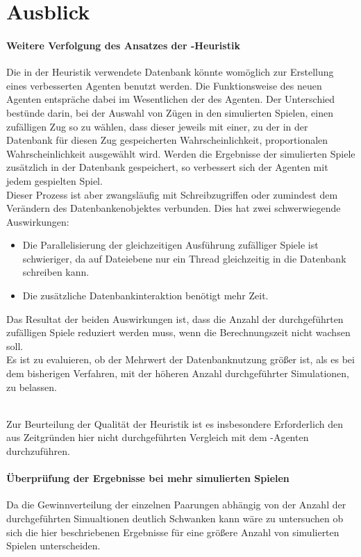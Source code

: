 
\section{Ausblick}
\paragraph{Weitere Verfolgung des Ansatzes der -Heuristik}
{\color{red}
Die in der  Heuristik verwendete Datenbank könnte womöglich zur Erstellung eines verbesserten Agenten benutzt werden. Die Funktionsweise des neuen Agenten entspräche dabei im Wesentlichen der des \mxZitat{\mc} Agenten. Der Unterschied bestünde darin, bei der Auswahl von Zügen in den simulierten Spielen, einen zufälligen Zug so zu wählen, dass dieser jeweils mit einer, zu der in der Datenbank für diesen Zug gespeicherten Wahrscheinlichkeit, proportionalen Wahrscheinlichkeit ausgewählt wird. Werden die Ergebnisse der simulierten Spiele zusätzlich in der Datenbank gespeichert, so verbessert sich der Agenten mit jedem gespielten Spiel.
\\Dieser Prozess ist aber zwangsläufig mit Schreibzugriffen oder zumindest dem Verändern des Datenbankenobjektes verbunden. Dies hat zwei schwerwiegende Auswirkungen:
\begin{itemize}
\item Die Parallelisierung der gleichzeitigen Ausführung zufälliger Spiele ist schwieriger, da auf Dateiebene nur ein Thread gleichzeitig in die Datenbank schreiben kann.
\item Die zusätzliche Datenbankinteraktion benötigt mehr Zeit.
\end{itemize}
Das Resultat der beiden Auswirkungen ist, dass die Anzahl der durchgeführten zufälligen Spiele reduziert werden muss, wenn die Berechnungszeit nicht wachsen soll.
\\Es ist zu evaluieren, ob der Mehrwert der Datenbanknutzung größer ist, als es bei dem bisherigen Verfahren, mit der höheren Anzahl durchgeführter Simulationen, zu belassen. }
\\Zur Beurteilung der Qualität der  Heuristik ist es insbesondere Erforderlich den aus Zeitgründen hier nicht durchgeführten Vergleich mit dem \mc -Agenten durchzuführen.
\paragraph{Überprüfung der Ergebnisse bei mehr simulierten Spielen}
Da die Gewinnverteilung der einzelnen Paarungen abhängig von der Anzahl der durchgeführten Simualtionen deutlich Schwanken kann wäre zu untersuchen ob sich die hier beschriebenen Ergebnisse für eine größere Anzahl von simulierten Spielen unterscheiden.
